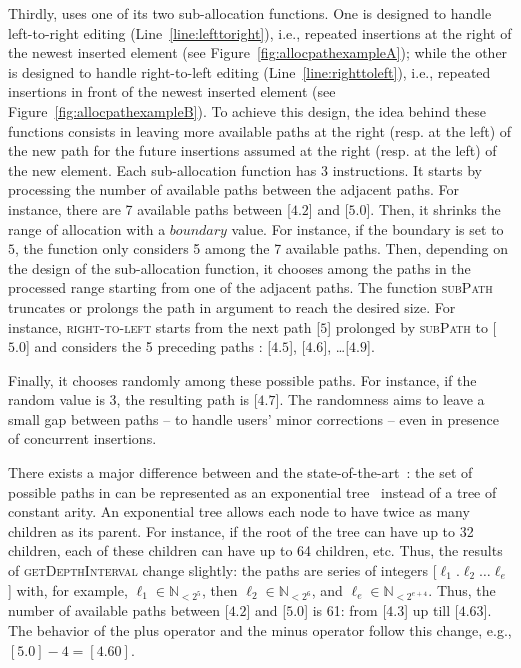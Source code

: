 \noindent Thirdly, \LSEQ uses one of its two sub-allocation functions. One is
designed to handle left-to-right editing (Line~\ref{line:lefttoright}), i.e.,
repeated insertions at the right of the newest inserted element (see
Figure~\ref{fig:allocpathexampleA}); while the other is designed to handle
right-to-left editing (Line~\ref{line:righttoleft}), i.e., repeated insertions
in front of the newest inserted element (see
Figure~\ref{fig:allocpathexampleB}). To achieve this design, the idea behind
these functions consists in leaving more available paths at the right (resp. at
the left) of the new path for the future insertions assumed at the right
(resp. at the left) of the new element. Each sub-allocation function has 3
instructions. It starts by processing the number of available paths between the
adjacent paths. For instance, there are 7 available paths between [$4.2$] and
[$5.0$]. Then, it shrinks the range of allocation with a $boundary$ value. For
instance, if the boundary is set to $5$, the function only considers 5 among the
7 available paths. Then, depending on the design of the sub-allocation function,
it chooses among the paths in the processed range starting from one of the
adjacent paths. The function \textsc{subPath} truncates or prolongs the path in
argument to reach the desired size. For instance, \textsc{right-to-left} starts
from the next path [$5$] prolonged by \textsc{subPath} to [$5.0$] and
considers the 5 preceding paths : [$4.5$], [$4.6$], \ldots [$4.9$].

\noindent Finally, it chooses randomly among these possible paths. For instance,
if the random value is 3, the resulting path is [$4.7$]. The randomness aims to
leave a small gap between paths -- to handle users' minor corrections -- even in
presence of concurrent insertions.

There exists a major difference between \LSEQ and the
state-of-the-art~\cite{preguica2009commutative, weiss2009logoot}: the set of
possible paths in \LSEQ can be represented as an exponential
tree~\cite{andersson1996faster,andersson2007dynamic} instead of a tree of
constant arity. An exponential tree allows each node to have twice as many
children as its parent. For instance, if the root of the tree can have up to 32
children, each of these children can have up to 64 children, etc. Thus, the
results of \textsc{getDepthInterval} change slightly: the paths are series of
integers [$\ell_1.\ell_2\ldots\ell_e$] with, for example,
$\ell_1\in\mathbb{N}_{<2^5}$, then $\ell_2\in \mathbb{N}_{<2^6}$, and
$\ell_{e}\in\mathbb{N}_{<2^{e+4}}$. Thus, the number of available paths between
[$4.2$] and [$5.0$] is 61: from [$4.3$] up till [$4.63$]. The behavior of the
plus operator and the minus operator follow this change, e.g.,
$[5.0]- 4 = [4.60]$.

